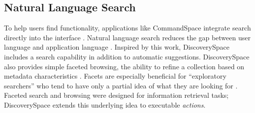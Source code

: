 \subsection{Natural Language Search}
To help users find functionality, applications like CommandSpace integrate search directly into the interface \cite{Adar2014}. Natural language search reduces the gap between user language and application language \cite{Adar2014}. Inspired by this work, Discovery\-Space includes a search capability in addition to automatic suggestions. Discovery\-Space also provides simple faceted browsing, the ability to refine a collection based on metadata characteristics \cite{Koren2008}. Facets are especially beneficial for ``exploratory searchers'' who tend to have only a partial idea of what they are looking for \cite{Hearst2006}. Faceted search and browsing were designed for information retrieval tasks; Discovery\-Space extends this underlying idea to executable \textit{actions}.

